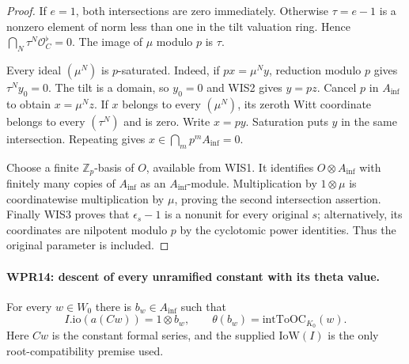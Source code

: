 \documentclass[11pt,a4paper]{article}
\numberwithin{equation}{section}
\theoremstyle{remark}\newtheorem{remark}[theorem]{Remark}
\begin{document}
\begin{proof}
If $e=1$, both intersections are zero immediately. Otherwise
$\tau=e-1$ is a nonzero element of norm less than one in the
tilt valuation ring. Hence $\bigcap_N\tau^N\mathcal O_C^\flat=0$.
The image of $\mu$ modulo $p$ is $\tau$.

Every ideal $(\mu^N)$ is $p$-saturated. Indeed, if
$p x=\mu^N y$, reduction modulo $p$ gives $\tau^Ny_0=0$.
The tilt is a domain, so $y_0=0$ and WIS2 gives $y=pz$.
Cancel $p$ in $A_{\mathrm{inf}}$ to obtain $x=\mu^Nz$.
If $x$ belongs to every $(\mu^N)$, its zeroth Witt coordinate
belongs to every $(\tau^N)$ and is zero. Write $x=py$.
Saturation puts $y$ in the same intersection. Repeating gives
$x\in\bigcap_m p^mA_{\mathrm{inf}}=0$.

Choose a finite $\mathbb Z_p$-basis of $O$, available from WIS1.
It identifies $O\otimes A_{\mathrm{inf}}$ with finitely many copies of
$A_{\mathrm{inf}}$ as an $A_{\mathrm{inf}}$-module. Multiplication by $1\otimes\mu$
is coordinatewise multiplication by $\mu$, proving the second
intersection assertion. Finally WIS3 proves that
$\epsilon_s-1$ is a nonunit for every original $s$; alternatively,
its coordinates are nilpotent modulo $p$ by the cyclotomic
power identities. Thus the original parameter is included.
\end{proof}

\paragraph{WPR14: descent of every unramified constant with its theta value.}
\label{claim:WPR14}
For every $w\in W_0$ there is $b_w\in A_{\mathrm{inf}}$ such that
\[
 I.\mathrm{io}(a(Cw))=1\otimes b_w,
             \qquad \theta(b_w)=\mathrm{intToOC}_{K_0}(w).
 \tag{WPR.16}
\]
Here $Cw$ is the constant formal series, and the supplied
$\mathrm{IoW}(I)$ is the only root-compatibility premise used.
\end{document}
